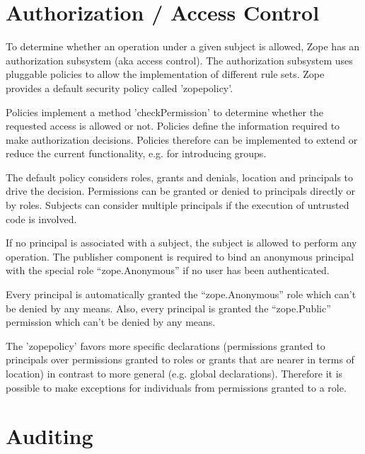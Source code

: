 \documentclass[10pt,a4paper,english]{book}
\begin{document}

\hypertarget{authorization-access-control}{}
\section{Authorization / Access Control}

To determine whether an operation under a given subject is allowed, Zope has an
authorization subsystem (aka access control). The authorization subsystem uses
pluggable policies to allow the implementation of different rule sets. Zope
provides a default security policy called 'zopepolicy'.

Policies implement a method 'checkPermission' to determine whether the
requested access is allowed or not. Policies define the information required to
make authorization decisions.  Policies therefore can be implemented to extend
or reduce the current functionality, e.g. for introducing groups.

The default policy considers roles, grants and denials, location and principals
to drive the decision. Permissions can be granted or denied to principals
directly or by roles.  Subjects can consider multiple principals if the
execution of untrusted code is involved.

If no principal is associated with a subject, the subject is allowed to perform
any operation. The publisher component is required to bind an anonymous
principal with the special role ``zope.Anonymous'' if no user has been
authenticated.

Every principal is automatically granted the ``zope.Anonymous'' role which can't be
denied by any means. Also, every principal is granted the ``zope.Public''
permission which can't be denied by any means.

The 'zopepolicy' favors more specific declarations (permissions granted to
principals over permissions granted to roles or grants that are nearer in terms
of location) in contrast to more general (e.g. global declarations). Therefore
it is possible to make exceptions for individuals from permissions granted to a
role.



\hypertarget{auditing}{}
\section{Auditing}
\end{document}
